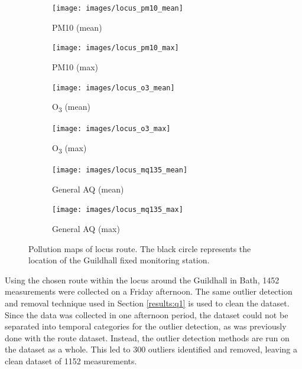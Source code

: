\documentclass[11pt,twosided,a4paper]{report}
\begin{document}
\begin{figure}[!tb]
    \centering
    \begin{minipage}{1\linewidth}
            \begin{subfigure}[t]{.5\linewidth}
                \texttt{[image: images/locus\_pm10\_mean]}
                \caption{PM10 (mean)}
                \label{fig:locus_pm10_mean}
            \end{subfigure}
            \begin{subfigure}[t]{.5\linewidth}
            	\texttt{[image: images/locus\_pm10\_max]}
            	\caption{PM10 (max)}
            	\label{fig:locus_pm10_max}
	   \end{subfigure}
        \end{minipage}
    \begin{minipage}{1\linewidth}
            \begin{subfigure}[t]{.5\linewidth}
                \texttt{[image: images/locus\_o3\_mean]}
                \caption{O\textsubscript{3} (mean)}
                \label{fig:locus_o3_mean}
            \end{subfigure}
            \begin{subfigure}[t]{.5\linewidth}
            	\texttt{[image: images/locus\_o3\_max]}
            	\caption{O\textsubscript{3} (max)}
            	\label{fig:locus_o3_max}
	   \end{subfigure}
        \end{minipage}
    \begin{minipage}{1\linewidth}
            \begin{subfigure}[t]{.5\linewidth}
                \texttt{[image: images/locus\_mq135\_mean]}
                \caption{General AQ (mean)}
                \label{fig:locus_mq135_mean}
            \end{subfigure}
            \begin{subfigure}[t]{.5\linewidth}
            	\texttt{[image: images/locus\_mq135\_max]}
            	\caption{General AQ (max)}
            	\label{fig:locus_mq135_max}
	   \end{subfigure}
        \end{minipage}
    \caption[Pollution maps of locus route.]{Pollution maps of locus route. The black circle represents the location of the Guildhall fixed monitoring station.}
    \label{fig:locus_maps}
\end{figure}

Using the chosen route within the locus around the Guildhall in Bath, \num{1452} measurements were collected on a Friday afternoon. The same outlier detection and removal technique used in Section \ref{results:q1} is used to clean the dataset. Since the data was collected in one afternoon period, the dataset could not be separated into temporal categories for the outlier detection, as was previously done with the route dataset. Instead, the outlier detection methods are run on the dataset as a whole. This led to 300 outliers identified and removed, leaving a clean dataset of 1152 measurements.
\end{document}
